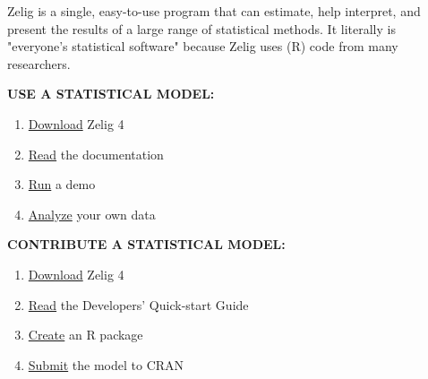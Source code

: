 \documentclass{article}
\begin{document}
Zelig is a single, easy-to-use program that can estimate, help interpret, and
present the results of a large range of statistical methods. It literally is
"everyone's statistical software" because Zelig uses (R) code from many
researchers.

\vspace{2em}

{\noindent \bf USE A STATISTICAL MODEL:}

\begin{enumerate}

  \item \underline{Download} Zelig 4

  \item \underline{Read} the documentation

  \item \underline{Run} a demo

  \item \underline{Analyze} your own data

\end{enumerate}

\vspace{2em}

{\noindent \bf CONTRIBUTE A STATISTICAL MODEL:}

\begin{enumerate}

  \item \underline{Download} Zelig 4

  \item \underline{Read} the Developers' Quick-start Guide

  \item \underline{Create} an R package

  \item \underline{Submit} the model to CRAN

\end{enumerate}
\end{document}
